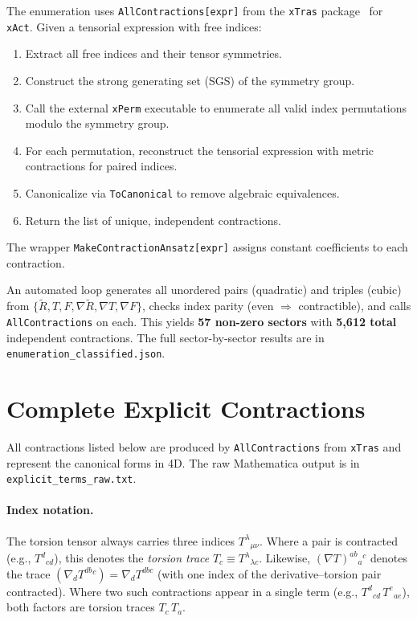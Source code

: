 \documentclass[12pt,a4paper]{article}
\newcommand{\Rt}{\tilde{R}}         %
\newcommand{\del}{\nabla}            %
\begin{document}
The enumeration uses \texttt{AllContractions[expr]} from the
\texttt{xTras} package~\cite{xTras} for \texttt{xAct}. Given a
tensorial expression with free indices:
\begin{enumerate}
  \item Extract all free indices and their tensor symmetries.
  \item Construct the strong generating set (SGS) of the symmetry group.
  \item Call the external \texttt{xPerm} executable to enumerate
    all valid index permutations modulo the symmetry group.
  \item For each permutation, reconstruct the tensorial expression
    with metric contractions for paired indices.
  \item Canonicalize via \texttt{ToCanonical} to remove algebraic
    equivalences.
  \item Return the list of unique, independent contractions.
\end{enumerate}
The wrapper \texttt{MakeContractionAnsatz[expr]} assigns constant
coefficients to each contraction.

An automated loop generates all unordered pairs (quadratic) and
triples (cubic) from $\{\Rt, T, F, \del\Rt, \del T, \del F\}$,
checks index parity (even $\Rightarrow$ contractible), and calls
\texttt{AllContractions} on each. This yields \textbf{57 non-zero
sectors} with \textbf{5,612 total} independent contractions.
The full sector-by-sector results are in
\texttt{enumeration\_classified.json}.


\section{Complete Explicit Contractions}
\label{sec:explicit_terms}

All contractions listed below are produced by
\texttt{AllContractions} from \texttt{xTras} and represent the
canonical forms in 4D. The raw Mathematica output is in
\texttt{explicit\_terms\_raw.txt}.

\paragraph{Index notation.}
The torsion tensor always carries three indices
$T^\lambda{}_{\mu\nu}$. Where a pair is contracted
(e.g., $T^d{}_{cd}$), this denotes the \emph{torsion trace}
$T_c \equiv T^\lambda{}_{\lambda c}$. Likewise,
$(\del T)^{ab}{}_{a}{}^{c}$ denotes the trace
$(\del_d T^{db}{}^c) = \del_d T^{dbc}$ (with one index of the
derivative--torsion pair contracted). Where two
such contractions appear in a single term (e.g.,
$T^d{}_{cd}\, T^e{}_{ae}$), both factors are torsion traces
$T_c\, T_a$.
\end{document}
